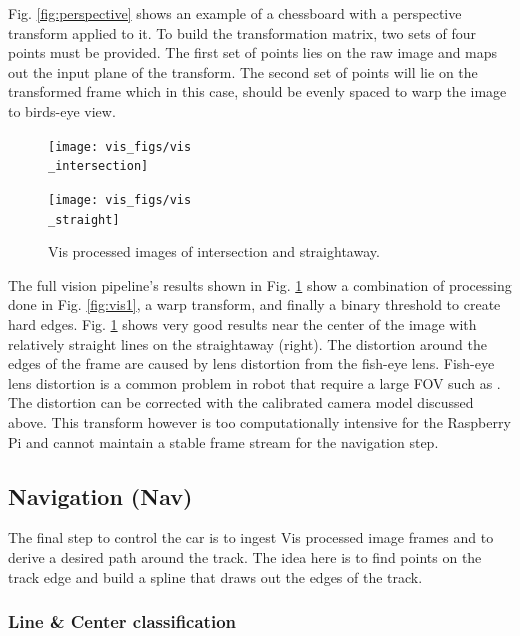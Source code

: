 \documentclass{article}
\begin{document}
Fig. \ref{fig:perspective} shows an example of a chessboard with a perspective transform applied to it. To build the transformation matrix, two sets of four points must be provided. The first set of points lies on the raw image and maps out the input plane of the transform. The second set of points will lie on the transformed frame which in this case, should be evenly spaced to warp the image to birds-eye view.

\begin{figure}[htb]
	\begin{minipage}[b]{.48\linewidth}
		\centering
		\centerline{\texttt{[image: vis\_figs/vis\\\_intersection]}}
	\end{minipage}
	\hfill
	\begin{minipage}[b]{0.48\linewidth}
		\centering
		\centerline{\texttt{[image: vis\_figs/vis\\\_straight]}}
	\end{minipage}
	\caption{Vis processed images of intersection and straightaway.}
	\label{fig:vis2}
\end{figure}

The full vision pipeline's results shown in Fig. \ref{fig:vis2} show a combination of processing done in Fig. \ref{fig:vis1}, a warp transform, and finally a binary threshold to create hard edges. Fig. \ref{fig:vis2} shows very good results near the center of the image with relatively straight lines on the straightaway (right). The distortion around the edges of the frame are caused by lens distortion from the fish-eye lens. Fish-eye lens distortion is a common problem in robot that require a large FOV such as \cite{b1}. The distortion can be corrected with the calibrated camera model discussed above. This transform however is too computationally intensive for the Raspberry Pi and cannot maintain a stable frame stream for the navigation step.

\subsection{Navigation (Nav)}

The final step to control the car is to ingest Vis processed image frames and to derive a desired path around the track. The idea here is to find points on the track edge and build a spline that draws out the edges of the track.

\subsubsection{Line \& Center classification}
\end{document}
